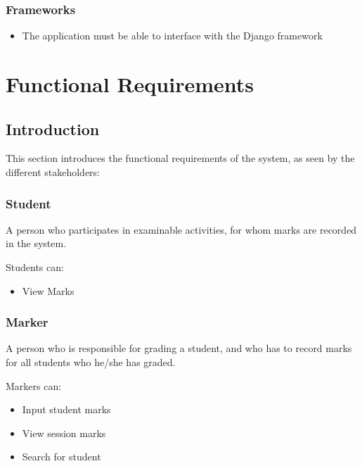 \documentclass[a4paper]{article}
\begin{document}
			\subsubsection{Frameworks}
			
				\begin{itemize}

					\item{The application must be able to interface with the Django framework}

				\end{itemize}

	\section{Functional Requirements}

		\subsection{Introduction}

			This section introduces the functional requirements of the system, as seen by the different stakeholders:

			\subsubsection{Student}
				\begin{flushleft}
				A person who participates in examinable activities, for whom marks are recorded in the system. \linebreak 
				
				Students can:
				\end{flushleft}
				\begin{itemize}

					\item{View Marks}

				\end{itemize}

			\subsubsection{Marker}
				\begin{flushleft}
				A person who is responsible for grading a student, and who has to record marks for all students who he/she has graded. \linebreak 
				
				Markers can:
				\end{flushleft}
				\begin{itemize}

					\item{Input student marks}
					
					\item{View session marks}
					
					\item{Search for student}

				\end{itemize}
				
\end{document}

